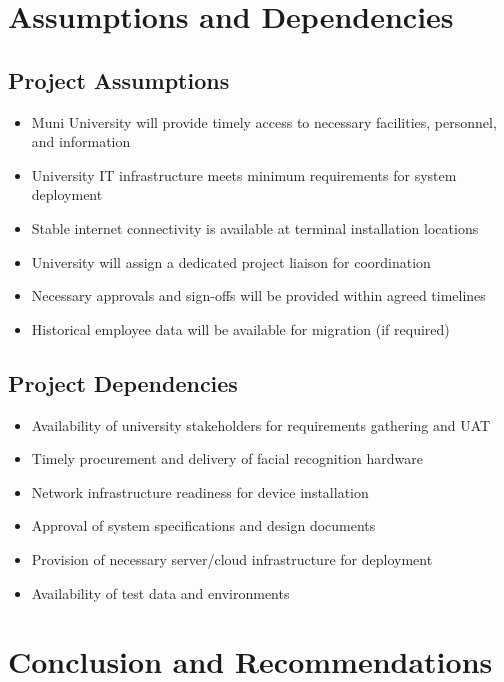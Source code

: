 \documentclass[12pt]{article}
\begin{document}
\section{Assumptions and Dependencies}

\subsection{Project Assumptions}

\begin{itemize}[noitemsep]
\item Muni University will provide timely access to necessary facilities, personnel, and information
\item University IT infrastructure meets minimum requirements for system deployment
\item Stable internet connectivity is available at terminal installation locations
\item University will assign a dedicated project liaison for coordination
\item Necessary approvals and sign-offs will be provided within agreed timelines
\item Historical employee data will be available for migration (if required)
\end{itemize}

\subsection{Project Dependencies}

\begin{itemize}[noitemsep]
\item Availability of university stakeholders for requirements gathering and UAT
\item Timely procurement and delivery of facial recognition hardware
\item Network infrastructure readiness for device installation
\item Approval of system specifications and design documents
\item Provision of necessary server/cloud infrastructure for deployment
\item Availability of test data and environments
\end{itemize}

\section{Conclusion and Recommendations}
\end{document}
